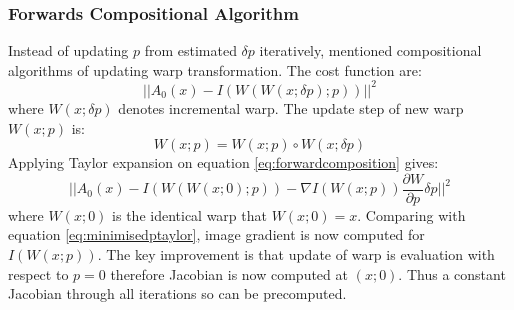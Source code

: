 \subsubsection{Forwards Compositional Algorithm}
\label{sec:fca}
Instead of updating $p$ from estimated $\delta p$ iteratively, \cite{Matthews2004} mentioned compositional algorithms of updating warp transformation. The cost function are:
\begin{equation}
\label{eq:forwardcomposition}
||A_0(x)-I(W(W(x;\delta p);p))||^2
\end{equation}
where $W(x;\delta p)$ denotes incremental warp. The update step of new warp $W(x;p)$ is:
\begin{equation}
W(x;p) = W(x;p)\circ W(x;\delta p)
\end{equation}
Applying Taylor expansion on equation \ref{eq:forwardcomposition} gives:
\begin{equation}
\label{eq:forwardcompositiontaylor}
||A_0(x)-I(W(W(x;0);p))-\nabla I(W(x;p))\frac{\partial W}{\partial p}\delta p||^2
\end{equation}
where $W(x;0)$ is the identical warp that $W(x;0) = x$. Comparing with equation \ref{eq:minimisedptaylor}, image gradient is now computed for $I(W(x;p))$. The key improvement is that update of warp is evaluation with respect to $p=0$ therefore Jacobian is now computed at $(x;0)$. Thus a constant Jacobian through all iterations so can be precomputed.

